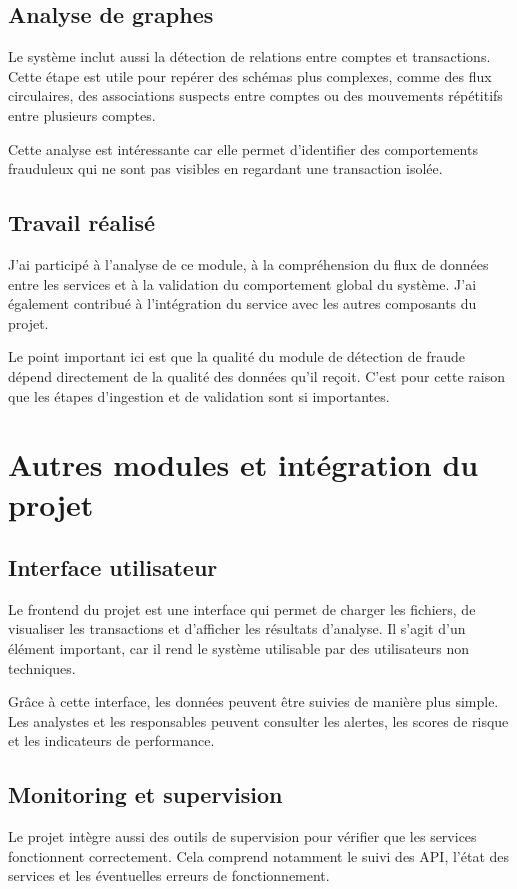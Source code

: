 ﻿\documentclass[12pt,a4paper]{report}
\begin{document}
\section{Analyse de graphes}
Le système inclut aussi la détection de relations entre comptes et transactions. Cette étape est utile pour repérer des schémas plus complexes, comme des flux circulaires, des associations suspects entre comptes ou des mouvements répétitifs entre plusieurs comptes.

Cette analyse est intéressante car elle permet d'identifier des comportements frauduleux qui ne sont pas visibles en regardant une transaction isolée.

\section{Travail réalisé}
J'ai participé à l'analyse de ce module, à la compréhension du flux de données entre les services et à la validation du comportement global du système. J'ai également contribué à l'intégration du service avec les autres composants du projet.

Le point important ici est que la qualité du module de détection de fraude dépend directement de la qualité des données qu'il reçoit. C'est pour cette raison que les étapes d'ingestion et de validation sont si importantes.

\chapter{Autres modules et intégration du projet}
\section{Interface utilisateur}
Le frontend du projet est une interface qui permet de charger les fichiers, de visualiser les transactions et d'afficher les résultats d'analyse. Il s'agit d'un élément important, car il rend le système utilisable par des utilisateurs non techniques.

Grâce à cette interface, les données peuvent être suivies de manière plus simple. Les analystes et les responsables peuvent consulter les alertes, les scores de risque et les indicateurs de performance.

\section{Monitoring et supervision}
Le projet intègre aussi des outils de supervision pour vérifier que les services fonctionnent correctement. Cela comprend notamment le suivi des API, l'état des services et les éventuelles erreurs de fonctionnement.
\end{document}
